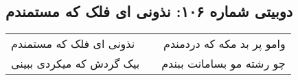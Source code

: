 \begin{center}
\section*{دوبیتی شماره ۱۰۶: نذونی ای فلک که مستمندم}
\label{sec:106}
\begin{longtable}{l p{0.5cm} r}
نذونی ای فلک که مستمندم
&&
وامو پر بد مکه که دردمندم
\\
بیک گردش که میکردی ببینی
&&
چو رشته مو بسامانت ببندم
\\
\end{longtable}
\end{center}
